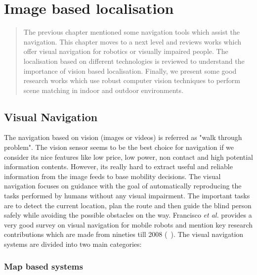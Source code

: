 \chapter{Image based localisation}
\label{chap:visualnavigate}
%
%
\vspace{-10.0em}
\begin{abstract}
The previous chapter mentioned some navigation tools 
which assist the navigation. This chapter moves to a 
next level and reviews works which 
offer visual navigation for robotics or 
visually impaired people. The localisation based 
on different technologies is reviewed to understand the 
importance of vision based localisation. 
Finally, we present some good research works 
which use robust computer vision techniques to 
perform scene matching in indoor and outdoor 
environments. 
\end{abstract}



\section{Visual Navigation}
The navigation based on vision (images or videos) 
is referred as "walk through problem". 
The vision sensor seems to be the best choice 
for navigation if we consider its nice features 
like low price, low power, non contact and 
high potential information contents. 
However, its really hard to extract useful 
and reliable information from the image feeds 
to base mobility decisions.
The visual navigation focuses on guidance with the 
goal of automatically reproducing the tasks performed
by humans without any visual impairment. The important tasks 
are to detect the current location, plan the route 
and then guide the blind person safely 
while avoiding the possible obstacles on the way. 
 Francisco \emph{et al.} provides a very good survey 
on visual navigation for mobile robots 
and mention key research contributions 
which are made from nineties till 2008 (~\citet{bonin-font08}).
The visual navigation systems are
divided into two main categories:



\subsection{Map based systems}
\label{sec:mapbasedsystem}

